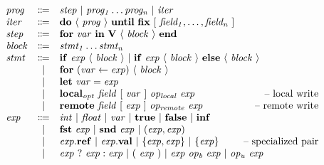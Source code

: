 \documentclass{sokendai_thesis} %
\newcommand{\hsp}[1]{\hspace{-3em}\hbox{#1}}
\begin{document}
\begin{figure}[t]
\normalsize
\[
\begin{array}{lclr}
\mathit{prog}  & \Coloneqq & \mathit{step}~|~\mathit{prog_1}\ldots\mathit{prog_n}~|~\mathit{iter} \\
\mathit{iter} & \Coloneqq & \mathbf{do}~\langle~\mathit{prog}~\rangle~\mathbf{until}~\mathbf{fix}~[~\mathit{field_1},\ldots,\mathit{field_n}~] \\
\mathit{step}& \Coloneqq & \mathbf{for}~\mathit{var}~\mathbf{in}~\mathbf{V}~\langle~\mathit{block}~\rangle~\mathbf{end} \\
\mathit{block} & \Coloneqq & \mathit{stmt_1} \ldots \mathit{stmt_n} \\
\mathit{stmt}  & \Coloneqq & \mathbf{if}~\mathit{exp}~\langle~\mathit{block}~\rangle~|~\mathbf{if}~\mathit{exp}~\langle~\mathit{block}~\rangle~\mathbf{else}~\langle~\mathit{block}~\rangle \\
 & | & \mathbf{for}~(\mathit{var}\leftarrow\mathit{exp})~\langle~\mathit{block}~\rangle \\
 & | & \mathbf{let}~\mathit{var}=\mathit{exp} \\
 & | & \mathbf{local}\mathit{_{opt}}~\mathit{field}~[~\mathit{var}~]~\mathit{op_{local}}~\mathit{exp} & \hsp{-- local write} \\
 & | & \mathbf{remote}~\mathit{field}~[~\mathit{exp}~]~\mathit{op_{remote}}~\mathit{exp} & \hsp{-- remote write} \\
\mathit{exp}   & \Coloneqq & \mathit{int}~|~\mathit{float}~|~\mathit{var}~|~\mathbf{true}~|~\mathbf{false}~|~\mathbf{inf} \\
 & | & \mathbf{fst}~\mathit{exp}~|~\mathbf{snd}~\mathit{exp}~|~(\mathit{exp},\mathit{exp}) \\
 & | & \mathit{exp}.\mathbf{ref}~|~\mathit{exp}.\mathbf{val}~|~\{\mathit{exp},\mathit{exp}\}~|~\{\mathit{exp}\} & \hsp{-- specialized pair} \\
 & | & \mathit{exp}~?~\mathit{exp}:\mathit{exp}~|~(~\mathit{exp}~)~|~\mathit{exp}~\mathit{op_{b}}~\mathit{exp}~|~\mathit{op_{u}}~\mathit{exp} \\

\end{array}\]
\end{figure}
\end{document}
